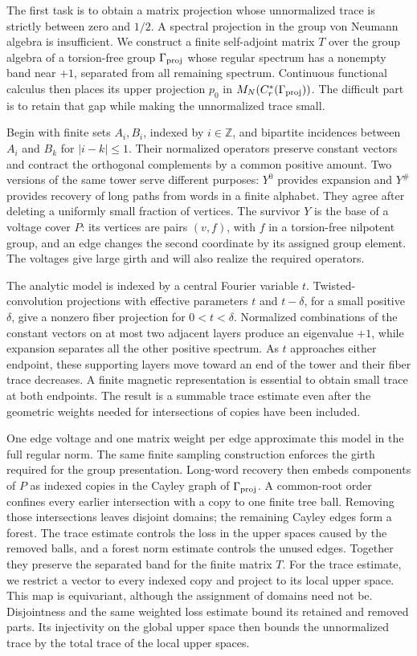 The first task is to obtain a matrix projection whose unnormalized trace
is strictly between zero and \(1/2\). A spectral projection in the group
von Neumann algebra is insufficient. We construct a finite self-adjoint
matrix \(T\) over the group algebra of a torsion-free group \(\Gamma_{\mathrm{proj}}\)
whose regular spectrum has a nonempty band near \(+1\), separated from
all remaining spectrum. Continuous functional calculus then places its
upper projection \(p_0\) in \(M_N(C_r^*(\Gamma_{\mathrm{proj}}))\). The difficult part
is to retain that gap while making the unnormalized trace small.

Begin with finite sets \(A_i,B_i\), indexed by \(i\in\mathbb Z\),
and bipartite incidences between \(A_i\) and \(B_k\) for \(|i-k|\le1\).
Their normalized operators preserve constant vectors and contract the
orthogonal complements by a common positive amount. Two versions of the
same tower serve different purposes: \(Y^0\) provides expansion and
\(Y^\#\) provides recovery of long paths from words in a finite alphabet.
They agree after deleting a uniformly small fraction of vertices.
The survivor \(Y\) is the base of a voltage cover \(P\): its vertices
are pairs \((v,f)\), with \(f\) in a torsion-free nilpotent group, and an
edge changes the second coordinate by its assigned group element.
The voltages give large girth and will also realize the required operators.

The analytic model is indexed by a central Fourier variable \(t\).
Twisted-convolution projections with effective parameters \(t\) and
\(t-\delta\), for a small positive \(\delta\), give a nonzero fiber
projection for \(0<t<\delta\). Normalized combinations of the constant
vectors on at most two adjacent layers produce an eigenvalue \(+1\),
while expansion separates all the other positive spectrum.
As \(t\) approaches either endpoint, these supporting layers move toward
an end of the tower and their fiber trace decreases. A finite magnetic
representation is essential to obtain small trace at both endpoints.
The result is a summable trace estimate even after the geometric weights
needed for intersections of copies have been included.

One edge voltage and one matrix weight per edge approximate this model
in the full regular norm. The same finite sampling construction enforces
the girth required for the group presentation. Long-word recovery then
embeds components of \(P\) as indexed copies in the Cayley graph of
\(\Gamma_{\mathrm{proj}}\). A common-root order confines every earlier intersection
with a copy to one finite tree ball. Removing those intersections leaves
disjoint domains; the remaining Cayley edges form a forest. The trace
estimate controls the loss in the upper spaces caused by the removed
balls, and a forest norm estimate controls the unused edges. Together
they preserve the separated band for the finite matrix \(T\).
For the trace estimate, we restrict a vector to every indexed copy and
project to its local upper space. This map is equivariant, although the
assignment of domains need not be. Disjointness and the same weighted
loss estimate bound its retained and removed parts. Its injectivity on
the global upper space then bounds the unnormalized trace by the total
trace of the local upper spaces.

